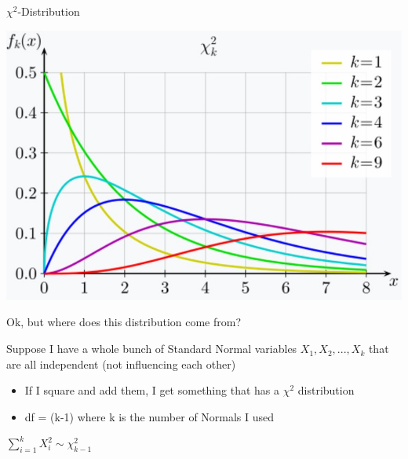 \documentclass{beamer}
\begin{document}
\begin{frame}{$\chi^2$-Distribution}
\begin{center}
    \includegraphics[scale=.3]{img/chi2_distr.jpg}
\end{center}
Ok, but where does this distribution come from? \vspace{4mm}

Suppose I have a whole bunch of Standard Normal variables $X_1, X_2, ... , X_k$ that are all independent (not influencing each other)
\begin{itemize}
    \item If I square and add them, I get something that has a $\chi^2$ distribution
    \item df = (k-1) where k is the number of Normals I used
\end{itemize} \vspace{4mm}
\begin{center}
$\sum_{i=1}^k X_i^2 \sim \chi^2_{k-1}$
\end{center}
\end{frame}
\end{document}
